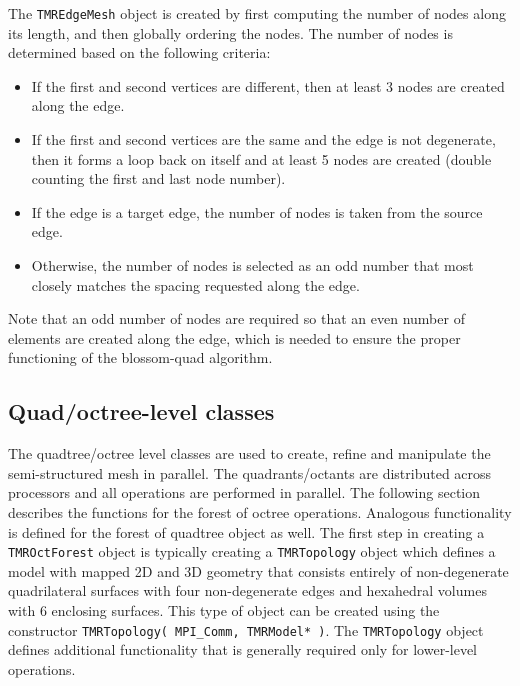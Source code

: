 \documentclass[12pt]{article}
\begin{document}
The \texttt{TMREdgeMesh} object is created by first computing the number of nodes along its length, and then globally ordering the nodes. The number of nodes is determined based on the following criteria:
\begin{itemize}
\item If the first and second vertices are different, then at least 3 nodes are created along the edge.
\item If the first and second vertices are the same and the edge is not degenerate, then it forms a loop back on itself and at least 5 nodes are created (double counting the first and last node number).
\item If the edge is a target edge, the number of nodes is taken from the source edge.
\item Otherwise, the number of nodes is selected as an odd number that most closely matches the spacing requested along the edge.
\end{itemize}
Note that an odd number of nodes are required so that an even number of elements are created along the edge, which is needed to ensure the proper functioning of the blossom-quad algorithm.

\subsection{Quad/octree-level classes}

The quadtree/octree level classes are used to create, refine and manipulate the semi-structured mesh in parallel.
The quadrants/octants are distributed across processors and all operations are performed in parallel.
The following section describes the functions for the forest of octree operations.
Analogous functionality is defined for the forest of quadtree object as well.
The first step in creating a \texttt{TMROctForest} object is typically creating a \texttt{TMRTopology} object which defines a model with mapped 2D and 3D geometry that consists entirely of non-degenerate quadrilateral surfaces with four non-degenerate edges and hexahedral volumes with 6 enclosing surfaces.
This type of object can be created using the constructor \texttt{TMRTopology( MPI\_Comm, TMRModel* )}.
The \texttt{TMRTopology} object defines additional functionality that is generally required only for lower-level operations.
\end{document}
